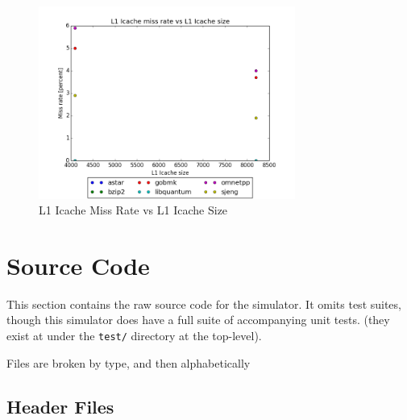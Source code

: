 \documentclass{article}
\begin{document}
\begin{figure}[ht]
    \centering
    \includegraphics[width=0.75\textwidth]{plots/L1icache_miss_vs_L1icache_size.png}
    \caption{L1 Icache Miss Rate vs L1 Icache Size}
    \label{fig:L1imissvsl1isize}
\end{figure}


\clearpage
\appendix
\section{Source Code}

This section contains the raw source code for the simulator. It omits test
suites, though this simulator does have a full suite of accompanying unit tests.
(they exist at under the \texttt{test/} directory at the top-level).

Files are broken by type, and then alphabetically

\subsection{Header Files}


\clearpage

\clearpage

\clearpage

\clearpage

\clearpage

\clearpage

\clearpage

\clearpage

\clearpage

\clearpage

\clearpage
\end{document}
